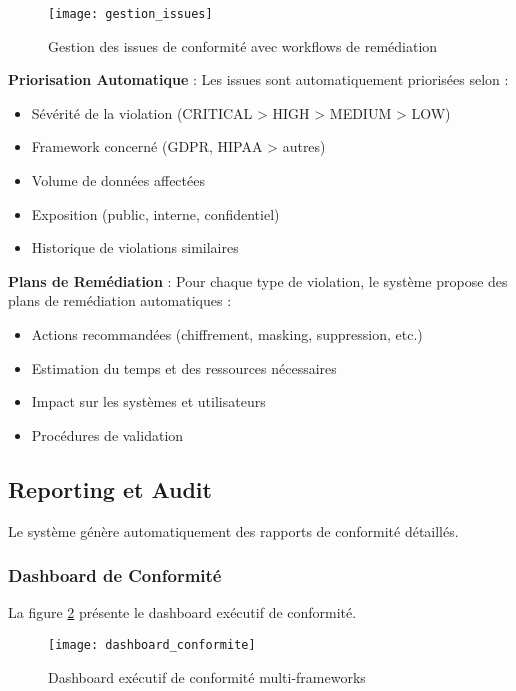 \begin{figure}[htpb]
\centering
\texttt{[image: gestion\_issues]}
\caption{Gestion des issues de conformité avec workflows de remédiation}
\label{fig:gestion_issues}
\end{figure}

\textbf{Priorisation Automatique} : Les issues sont automatiquement priorisées selon :
\begin{itemize}
    \item Sévérité de la violation (CRITICAL > HIGH > MEDIUM > LOW)
    \item Framework concerné (GDPR, HIPAA > autres)
    \item Volume de données affectées
    \item Exposition (public, interne, confidentiel)
    \item Historique de violations similaires
\end{itemize}

\textbf{Plans de Remédiation} : Pour chaque type de violation, le système propose des plans de remédiation automatiques :
\begin{itemize}
    \item Actions recommandées (chiffrement, masking, suppression, etc.)
    \item Estimation du temps et des ressources nécessaires
    \item Impact sur les systèmes et utilisateurs
    \item Procédures de validation
\end{itemize}

\subsection{Reporting et Audit}

Le système génère automatiquement des rapports de conformité détaillés.

\subsubsection{Dashboard de Conformité}

La figure \ref{fig:dashboard_conformite} présente le dashboard exécutif de conformité.

\begin{figure}[htpb]
\centering
\texttt{[image: dashboard\_conformite]}
\caption{Dashboard exécutif de conformité multi-frameworks}
\label{fig:dashboard_conformite}
\end{figure}

